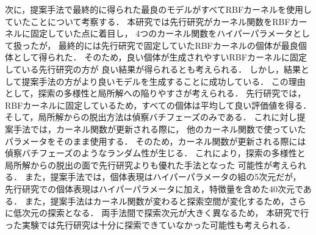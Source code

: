 次に，提案手法で最終的に得られた最良のモデルがすべてRBFカーネルを使用していたことについて考察する．
本研究では先行研究がカーネル関数をRBFカーネルに固定していた点に着目し，
4つのカーネル関数をハイパーパラメータとして扱ったが，
最終的には先行研究で固定していたRBFカーネルの個体が最良個体として得られた．
そのため，良い個体が生成されやすいRBFカーネルに固定している先行研究の方が
良い結果が得られるとも考えられる．
しかし，結果として提案手法の方がより良いモデルを生成することに成功している．
この理由として，探索の多様性と局所解への陥りやすさが考えられる．
先行研究では，RBFカーネルに固定しているため，すべての個体は平均して良い評価値を得る．
そして，局所解からの脱出方法は偵察バチフェーズのみである．
これに対し提案手法では，カーネル関数が更新される際に，
他のカーネル関数で使っていたパラメータをそのまま使用する．
そのため，カーネル関数が更新される際には偵察バチフェーズのようなランダム性が生じる．
これにより，探索の多様性と局所解からの脱出の面で先行研究よりも優れた手法となった
可能性が考えられる．
また，提案手法では，個体表現はハイパーパラメータの組の5次元だが，
先行研究での個体表現はハイパーパラメータに加え，特徴量を含めた40次元である．
また，提案手法はカーネル関数が変わると探索空間が変化するため，さらに低次元の探索となる．
両手法間で探索次元が大きく異なるため，
本研究で行った実験では先行研究は十分に探索できていなかった可能性も考えられる．